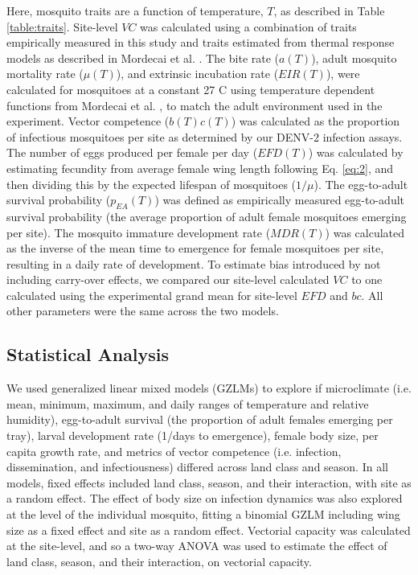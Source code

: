 \documentclass[doublespacing, linenumbers]{bmcart}
\begin{document}
Here, mosquito traits are a function of temperature, $T$, as described in Table \ref{table:traits}.
Site-level $VC$ was calculated using a combination of traits empirically measured in this study and traits estimated from thermal response models as described in Mordecai et al. \cite{mordecai2017}.
The bite rate ($a(T)$), adult mosquito mortality rate ($\mu(T)$), and extrinsic incubation rate ($EIR(T)$), were calculated for mosquitoes at a constant 27 \degree C using temperature dependent functions from Mordecai et al. \cite{mordecai2017}, to match the adult environment used in the experiment.
Vector competence ($b(T)c(T)$) was calculated as the proportion of infectious mosquitoes per site as determined by our DENV-2 infection assays.
The number of eggs produced per female per day ($EFD(T)$) was calculated by estimating fecundity from average female wing length following Eq. \ref{eq:2}, and then dividing this by the expected lifespan of mosquitoes ($1/\mu$).
The egg-to-adult survival probability ($p_{EA}(T)$) was defined as empirically measured egg-to-adult survival probability (the average proportion of adult female mosquitoes emerging per site).
The mosquito immature development rate ($MDR(T)$) was calculated as the inverse of the mean time to emergence for female mosquitoes per site, resulting in a daily rate of development.
To estimate bias introduced by not including carry-over effects, we compared our site-level calculated $VC$ to one calculated using the experimental grand mean for site-level $EFD$ and $bc$.
All other parameters were the same across the two models.

\subsection*{Statistical Analysis}

We used generalized linear mixed models (GZLMs) to explore if microclimate (i.e. mean, minimum, maximum, and daily ranges of temperature and relative humidity), egg-to-adult survival (the proportion of adult females emerging per tray), larval development rate (1/days to emergence), female body size, per capita growth rate, and metrics of vector competence (i.e. infection, dissemination, and infectiousness) differed across land class and season.
In all models, fixed effects included land class, season, and their interaction, with site as a random effect.
The effect of body size on infection dynamics was also explored at the level of the individual mosquito, fitting a binomial GZLM including wing size as a fixed effect and site as a random effect.
Vectorial capacity was calculated at the site-level, and so a two-way ANOVA was used to estimate the effect of land class, season, and their interaction, on vectorial capacity.
\end{document}
